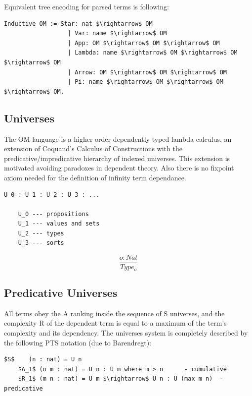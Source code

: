 \documentclass[11pt,oneside]{article}
\begin{document}
Equivalent tree encoding for parsed terms is following:
\vspace{0.5cm}
\begin{lstlisting}[mathescape=true]
    Inductive OM := Star: nat $\rightarrow$ OM
                  | Var: name $\rightarrow$ OM
                  | App: OM $\rightarrow$ OM $\rightarrow$ OM
                  | Lambda: name $\rightarrow$ OM $\rightarrow$ OM $\rightarrow$ OM
                  | Arrow: OM $\rightarrow$ OM $\rightarrow$ OM
                  | Pi: name $\rightarrow$ OM $\rightarrow$ OM $\rightarrow$ OM.
\end{lstlisting}

\newpage
\subsection{Universes}

The OM language is a higher-order dependently typed lambda calculus,
an extension of Coquand's Calculus of Constructions
with the predicative/impredicative hierarchy of indexed universes.
This extension is motivated avoiding paradoxes in dependent theory.
Also there is no fixpoint axiom needed for the definition
of infinity term dependance.

\vspace{0.5cm}
\begin{lstlisting}[mathescape=true]
    U_0 : U_1 : U_2 : U_3 : ...

    U_0 --- propositions
    U_1 --- values and sets
    U_2 --- types
    U_3 --- sorts
\end{lstlisting}

\begin{equation}
\tag{S}
\dfrac
{o : Nat}
{Type_o}
\end{equation}

\subsection{Predicative Universes}

All terms obey the A ranking inside the sequence of S universes,
and the complexity R of the dependent term is equal to a maximum of
the term's complexity and its dependency.
The universes system is completely described by the following
PTS notation (due to Barendregt):

\vspace{0.5cm}
\begin{lstlisting}[mathescape=true]
    $S$    (n : nat) = U n
    $A_1$ (n m : nat) = U n : U m where m > n      - cumulative
    $R_1$ (m n : nat) = U m $\rightarrow$ U n : U (max m n)  - predicative
\end{lstlisting}
\end{document}
